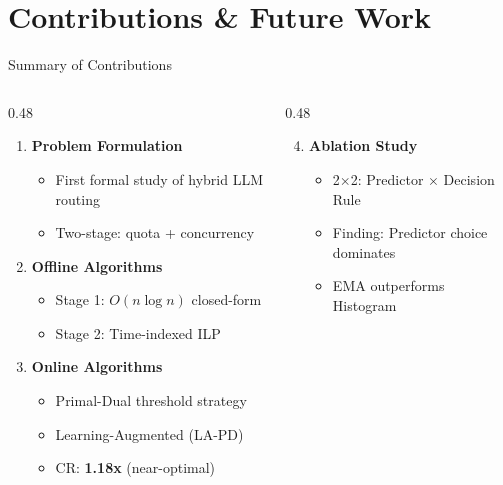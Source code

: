 \documentclass[aspectratio=169,10pt]{beamer}
\begin{document}
\section{Contributions \& Future Work}

\begin{frame}{Summary of Contributions}
\begin{columns}[T]
\begin{column}{0.48\textwidth}
\begin{enumerate}
    \item \textbf{Problem Formulation}
    \begin{itemize}
        \item First formal study of hybrid LLM routing
        \item Two-stage: quota + concurrency
    \end{itemize}

    \vspace{0.2cm}
    \item \textbf{Offline Algorithms}
    \begin{itemize}
        \item Stage 1: $O(n \log n)$ closed-form
        \item Stage 2: Time-indexed ILP
    \end{itemize}

    \vspace{0.2cm}
    \item \textbf{Online Algorithms}
    \begin{itemize}
        \item Primal-Dual threshold strategy
        \item Learning-Augmented (LA-PD)
        \item CR: \textbf{1.18x} (near-optimal)
    \end{itemize}
\end{enumerate}
\end{column}

\begin{column}{0.48\textwidth}
\begin{enumerate}
    \setcounter{enumi}{3}
    \item \textbf{Ablation Study}
    \begin{itemize}
        \item 2$\times$2: Predictor $\times$ Decision Rule
        \item Finding: Predictor choice dominates
        \item EMA outperforms Histogram
    \end{itemize}


\end{enumerate}
\end{column}
\end{columns}
\end{frame}
\end{document}
